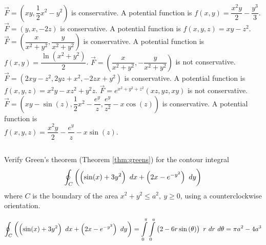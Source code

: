 \begin{Answer}
    
     \Question $\vec F = \left(xy, \dfrac{1}{2}x^2-y^2 \right)$ is conservative. A potential function is $f(x,y) = \dfrac{x^2y}{2} - \dfrac{y^3}{3}$.
     \Question $\vec F = \left(y, x, -2z \right)$ is conservative. A potential function is $f(x,y,z) = xy - z^2$.
     \Question $\vec F = \left( \dfrac{x}{x^2+y^2}, \dfrac{y}{x^2+y^2} \right)$ is conservative. A potential function is $f(x,y) = \dfrac{\ln \left(x^2 + y^2 \right)}{2} $. 
     \Question $\vec F = \left( \dfrac{x}{x^2+y^2}, -\dfrac{y}{x^2+y^2} \right)$ is not conservative. 
     \Question $\vec F = \left( 2xy-z^2, 2yz+x^2, -2zx+y^2\right)$ is conservative. A potential function is \\ $f(x,y,z) = x^2y-xz^2+y^2z$.
     \Question $\vec F = e^{x^2+y^2+z^2}\left( xz, yz, xy\right)$ is not conservative. 
     \Question $\vec F = \left( xy - \sin (z), \dfrac{1}{2}x^2 - \dfrac{e^y}{z}, \dfrac{e^y}{z^2} - x \cos (z)\right)$ is conservative. A potential function is \\ $f(x,y,z) = \dfrac{x^2y}{2} -  \dfrac{e^y}{z} - x \sin(z)$.
     
\end{Answer}




\subsection*{}
\begin{Exercise}[difficulty = 3] Verify Green's theorem (Theorem \ref{thm:greens}) for the contour integral
$$\displaystyle \oint_C \left( \left( \sin (x) + 3y^2\right) \ dx + \left( 2x-e^{-y^2} \right) \ dy \right)$$
where $C$ is the boundary of the area $x^2 + y^2 \leq a^2, \ y \geq 0$, using a counterclockwise orientation.  %
\end{Exercise}

\begin{Answer}
    $\displaystyle \oint_C \left( \left( \sin (x) + 3y^2\right) \ dx + \left( 2x-e^{-y^2} \right) \ dy \right) = \displaystyle \int\limits_0^{\pi} \int\limits_0^a \left( 2-6 r \sin \left(\theta \right) \right) \ r \ dr \ d\theta = \pi a^2 - 4 a^3$
\end{Answer}


